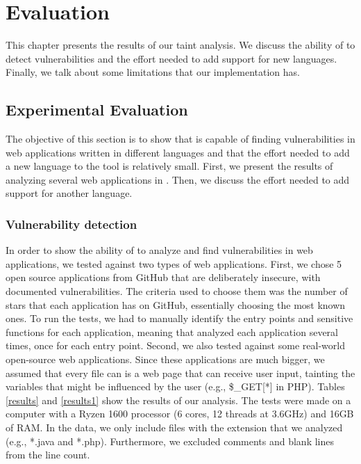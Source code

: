 
\chapter{Evaluation}
\label{chapter:results}

This chapter presents the results of our taint analysis. We discuss the ability of \toolname{} to detect vulnerabilities and the effort needed to add support for new languages. Finally, we talk about some limitations that our implementation has.

\section{Experimental Evaluation}
\label{evaluation}
The objective of this section is to show that \toolname{} is capable of finding vulnerabilities in web applications written in different languages and that the effort needed to add a new language to the tool is relatively small. First, we present the results of analyzing several web applications in \implangs{}. Then, we discuss the effort needed to add support for another language.


\subsection{Vulnerability detection}
In order to show the ability of \toolname{} to analyze and find vulnerabilities in web applications, we tested \toolname{} against two types of web applications. First, we chose 5 open source applications from GitHub that are deliberately insecure, with documented vulnerabilities. The criteria used to choose them was the number of stars that each application has on GitHub, essentially choosing the most known ones. To run the tests, we had to manually identify the entry points and sensitive functions for each application, meaning that \toolname{} analyzed each application several times, once for each entry point. Second, we also tested \toolname{} against some real-world open-source web applications. Since these applications are much bigger, we assumed that every file can is a web page that can receive user input, tainting the variables that might be influenced by the user (e.g., \$\_GET[*] in PHP). Tables \ref{results} and \ref{results1} show the results of our analysis. The tests were made on a computer with a Ryzen 1600 processor (6 cores, 12 threads at 3.6GHz) and 16GB of RAM. In the data, we only include files with the extension that we analyzed (e.g., *.java and *.php). Furthermore, we excluded comments and blank lines from the line count. 

